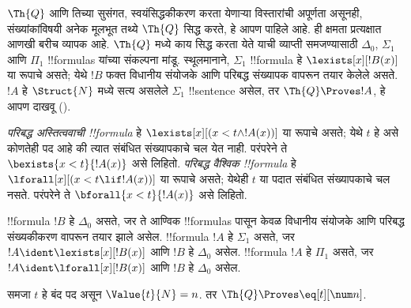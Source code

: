 \documentclass[../../../include/open-logic-section]{subfiles}
\begin{document}

$\Th{Q}$ आणि तिच्या सुसंगत, स्वयंसिद्धकीकरण करता येणाऱ्या
विस्तारांची अपूर्णता असूनही, संख्यांकांविषयी अनेक मूलभूत तथ्ये
$\Th{Q}$ सिद्ध करते, हे आपण पाहिले आहे. ही क्षमता प्रत्यक्षात
आणखी बरीच व्यापक आहे. $\Th{Q}$ मध्ये काय सिद्ध करता येते
याची व्याप्ती समजण्यासाठी $\Delta_0$, $\Sigma_1$ आणि
$\Pi_1$ !!{formula}s यांच्या संकल्पना मांडू. स्थूलमानाने,
$\Sigma_1$ !!{formula} हे $\lexists[x][!B(x)]$ या रूपाचे
असते; येथे $!B$ फक्त विधानीय संयोजके आणि परिबद्ध संख्यापक
वापरून तयार केलेले असते. $!A$ हे $\Struct{N}$ मध्ये सत्य
असलेले $\Sigma_1$ !!{sentence} असेल, तर
$\Th{Q} \Proves !A$, हे आपण दाखवू
().

\begin{defn}
\emph{परिबद्ध अस्तित्ववाची !!{formula}} हे
$\lexists[x][(x < t \land !A(x))]$ या रूपाचे असते; येथे $t$
हे असे कोणतेही पद आहे की त्यात संबंधित संख्यापकाचे चल येत नाही. परंपरेने ते
$\bexists{x < t}{!A(x)}$ असे लिहितो.
%
\emph{परिबद्ध वैश्विक !!{formula}} हे
$\lforall[x][(x < t \lif !A(x))]$ या रूपाचे असते; येथेही
$t$ या पदात संबंधित संख्यापकाचे चल नसते. परंपरेने ते
$\bforall{x < t}{!A(x)}$ असे लिहितो.
\end{defn}

\begin{defn}
!!{formula} $!B$ हे $\Delta_0$ असते, जर ते आण्विक
!!{formula}s पासून केवळ विधानीय संयोजके आणि परिबद्ध
संख्यकीकरण वापरून तयार झाले असेल.
%
!!{formula} $!A$ हे $\Sigma_1$ असते, जर
$!A \ident \lexists[x][!B(x)]$ आणि $!B$ हे $\Delta_0$
असेल.
%
!!{formula} $!A$ हे $\Pi_1$ असते, जर
$!A \ident \lforall[x][!B(x)]$ आणि $!B$ हे $\Delta_0$
असेल.
\end{defn}

\begin{lem}
 समजा $t$ हे बंद पद असून
$\Value{t}{N} = n$. तर $\Th{Q} \Proves \eq[t][\num n]$.
\end{lem}
\end{document}
